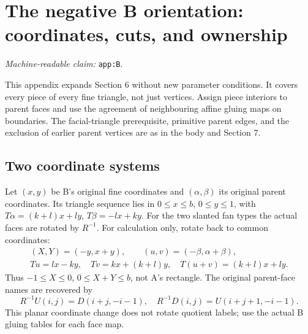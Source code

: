 \documentclass[11pt]{amsart}
\newcommand{\record}[1]{\nolinkurl{#1}}
\newcommand{\claimid}[1]{\par\nopagebreak\noindent\textit{Machine-readable claim:} \record{#1}.\par}
\begin{document}
\clearpage
\section{The negative B orientation: coordinates, cuts, and ownership}\label{app:B}
\claimid{app:B}
This appendix expands Section 6 without new parameter conditions. It
covers every piece of every fine triangle, not just vertices. Assign
piece interiors to parent faces and use the agreement of neighbouring
affine gluing maps on boundaries. The facial-triangle prerequisite,
primitive parent edges, and the exclusion of earlier parent vertices
are as in the body and Section 7.

\subsection{Two coordinate systems}
Let $(x,y)$ be B's original fine coordinates and $(\alpha,\beta)$ its
original parent coordinates. Its triangle sequence lies in
$0\le x\le b$, $0\le y\le1$, with
$T\alpha=(k+l)x+ly$, $T\beta=-lx+ky$.
For the two slanted fan types the actual faces are rotated by $R^{-1}$.
For calculation only, rotate back to common coordinates:
\begin{equation}\label{eq:B1}
\begin{gathered}
(X,Y)=(-y,x+y),\qquad(u,v)=(-\beta,\alpha+\beta),\\
Tu=lx-ky,\quad Tv=kx+(k+l)y,\quad
T(u+v)=(k+l)x+ly.
\end{gathered}\tag{B1}
\end{equation}
Thus $-1\le X\le0$, $0\le X+Y\le b$, not A's rectangle.
The original parent-face names are recovered by
\begin{equation}\label{eq:B2}
R^{-1}U(i,j)=D(i+j,-i-1),\quad
R^{-1}D(i,j)=U(i+j+1,-i-1).\tag{B2}
\end{equation}
This planar coordinate change does not rotate quotient labels; use
the actual B gluing tables for each face map.
\end{document}
